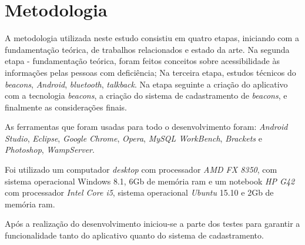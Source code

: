 \chapter{Metodologia}

A metodologia utilizada neste estudo consistiu em quatro etapas, iniciando com a fundamentação teórica, de trabalhos relacionados e estado da arte. Na segunda etapa - fundamentação teórica, foram feitos conceitos sobre acessibilidade às informações pelas pessoas com deficiência; Na terceira etapa, estudos técnicos do \textit{beacons}, \textit{Android}, \textit{bluetooth}, \textit{talkback}. Na etapa seguinte a criação do aplicativo com a tecnologia \textit{beacons}, a criação do sistema de cadastramento de \textit{beacons}, e finalmente as considerações finais.

As ferramentas que foram usadas para todo o desenvolvimento foram: \textit{Android Studio}, \textit{Eclipse}, \textit{Google Chrome}, \textit{Opera}, \textit{MySQL WorkBench}, \textit{Brackets} e \textit{Photoshop}, \textit{WampServer}.

Foi utilizado um computador \textit{desktop} com processador \textit{AMD FX 8350}, com sistema operacional Windows 8.1, 6Gb de memória ram e um notebook \textit{HP G42} com processador \textit{Intel Core i5}, sistema operacional \textit{Ubuntu} 15.10 e 2Gb de memória ram.

Após a realização do desenvolvimento iniciou-se a parte dos testes para garantir a funcionalidade tanto do aplicativo quanto do sistema de cadastramento.